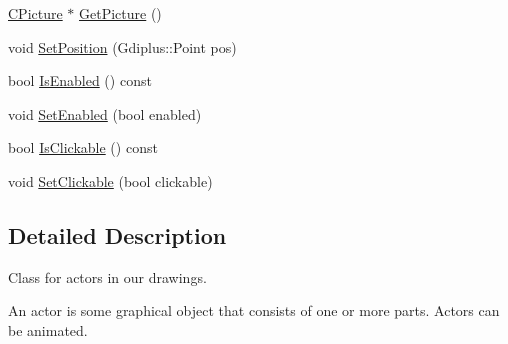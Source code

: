 \begin{DoxyCompactItemize}
\item 
\hyperlink{class_c_picture}{C\+Picture} $\ast$ \hyperlink{class_c_actor_af94c21dd8535aaa4992904cdbec27b84}{Get\+Picture} ()
\item 
void \hyperlink{class_c_actor_af0bda8fd0ba0320f9fd6e67b7b16a07d}{Set\+Position} (Gdiplus\+::\+Point pos)
\item 
bool \hyperlink{class_c_actor_ab3e78932aeb9e2a764670bc82ac85094}{Is\+Enabled} () const 
\item 
void \hyperlink{class_c_actor_a6f9009e9753b07a00266cac01af2fdad}{Set\+Enabled} (bool enabled)
\item 
bool \hyperlink{class_c_actor_a2a5738cceea3dc667611ba4c4d9a5db4}{Is\+Clickable} () const 
\item 
void \hyperlink{class_c_actor_a6c717ba1037b3055a5ec94e18e1707de}{Set\+Clickable} (bool clickable)
\end{DoxyCompactItemize}


\subsection{Detailed Description}
Class for actors in our drawings.

An actor is some graphical object that consists of one or more parts. Actors can be animated. 

